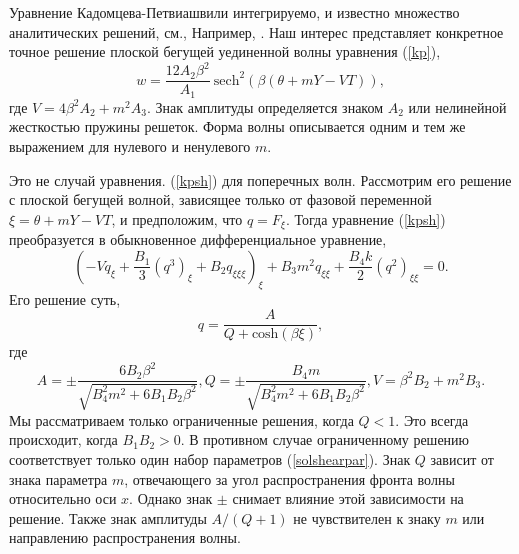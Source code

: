 Уравнение Кадомцева-Петвиашвили интегрируемо, и известно множество аналитических решений, см., Например, \cite{Ablowitz}. Наш интерес представляет конкретное точное решение плоской бегущей уединенной волны уравнения (\ref {kp}),
\begin{equation}
	w=\frac{12A_2 \beta^2}{A_1}~{\text{sech}}^2\left(\beta( \theta+m Y - V T)\right), \label{solkp}
\end{equation}
где $V=4\beta^2 A_2+m^2 A_3 $. 
Знак амплитуды определяется знаком $A_2$ или нелинейной жесткостью пружины решеток. Форма волны описывается одним и тем же выражением для нулевого и ненулевого $m$.

Это не случай уравнения. (\ref{kpsh}) для поперечных волн. Рассмотрим его решение с плоской бегущей волной, зависящее только от фазовой переменной $\xi = \theta + m Y - V T$, и предположим, что $ q = F_\xi $. Тогда уравнение (\ref {kpsh}) преобразуется в обыкновенное дифференциальное уравнение,
\[
(-V q_\xi+\frac{B_1}{3} (q^3)_\xi+B_2 q_{\xi\xi\xi})_\xi+B_3m^2  q_{\xi\xi} +\frac{B_4 k}{2} (q^2)_{\xi\xi}=0.
\]
Его решение суть,
\begin{equation}
	q=\frac{A}{Q+{\text{cosh}( \beta \xi)}},\label{solshear}
\end{equation}
где
\begin{equation}
	A=\pm \frac{6B_2 \beta^2}{\sqrt{B_4^2 m^2+6 B_1 B_2 \beta^2}}, 
	Q=\pm\frac{B_4 m }{\sqrt{B_4^2 m^2+6 B_1 B_2 \beta^2}},  V=\beta^2 B_2+m^2 B_3 . \label{solshearpar}
\end{equation}
Мы рассматриваем только ограниченные решения, когда $Q<1$. Это всегда происходит, когда $B_1 B_2> 0$. В противном случае ограниченному решению соответствует только один набор параметров (\ref{solshearpar}). Знак $Q$ зависит от знака параметра $ m $, отвечающего за угол распространения фронта волны относительно оси $x$. Однако знак $\pm$ снимает влияние этой зависимости на решение. Также знак амплитуды $A / (Q + 1)$ не чувствителен к знаку $m$ или направлению распространения волны.

